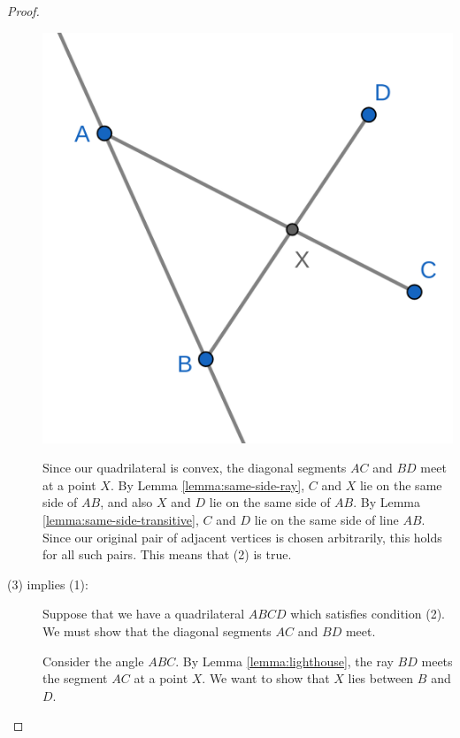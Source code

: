 \documentclass{tufte-handout}
\theoremstyle{definition}
\begin{document}
\begin{proof}
\begin{description}
\begin{marginfigure}
  \includegraphics{images/convex_3.png}
\end{marginfigure}


Since our quadrilateral is convex, the diagonal segments $AC$ and $BD$ meet at a point $X$. By Lemma \ref{lemma:same-side-ray}, $C$ and $X$ lie on the same side of $AB$, and also $X$ and $D$ lie on the same side of $AB$. By Lemma \ref{lemma:same-side-transitive}, $C$ and $D$ lie on the same side of line $AB$. Since our original pair of adjacent vertices is chosen arbitrarily, this holds for all such pairs. This means that (2) is true.

\item[(3) implies (1):] Suppose that we have a quadrilateral $ABCD$ which satisfies condition (2). We must show that the diagonal segments $AC$ and $BD$ meet.

Consider the angle $ABC$. By Lemma \ref{lemma:lighthouse}, the ray $BD$ meets the segment $AC$ at a point $X$. We want to show that $X$ lies between $B$ and $D$.


\end{description}
\end{proof}
\end{document}
